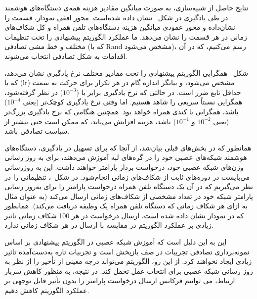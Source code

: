 نتایج حاصل از شبیه‌سازی، به صورت میانگین مقادیر هزینه همه‌ی دستگاه‌های هوشمند در طی یادگیری در شکل~ نشان‌ داده شده‌است. محور افقی نمودار، قسمت را نشان‌داده و محور عمودی میانگین هزینه دستگاه‌های تلفن همراه و کل شکاف‌های زمانی در هر قسمت را نشان می‌دهد. ما عملکرد الگوریتم پیشنهادی را تحت تنظیمات مختلف و خط مشی تصادفی (که با Rand مشخص می‌شود)، رسم می‌کنیم، که در آن اقدامات به شکل تصادفی انتخاب می‌شوند.



شکل~ همگرایی الگوریتم پیشنهادی را تحت مقادیر مختلف نرخ یادگیری نشان می‌دهد، که با (lr) مشخص می‌شود، و بیانگر اندازه گام در هر تکرار برای حرکت به سمت حداقل تابع ضرر است. در حالتی که نرخ یادگیری برابر با ($10^{-3}$) در نظر گرفته‌شود، همگرایی نسبتاً سریعی را شاهد هستیم. اما وقتی نرخ یادگیری کوچک‌تر (یعنی $10^{-4}$) باشد، همگرایی با کندی همراه خواهد بود. همچنین هنگامی که نرخ یادگیری بزرگ‌تر (یعنی $ 10^{-‌2}$ و $10^{-1}$) باشد، هزینه افزایش می‌یابد، که ممکن است حتی بیشتر از سیاست تصادفی باشد.
 



همانطور که در بخش‌های قبلی بیان‌شد، از آنجا که برای تسهیل در یادگیری، دستگاه‌های هوشمند شبکه‌های عصبی خود را در گره‌های لبه آموزش می‌دهند، برای به روز رسانی وزن‌های شبکه عصبی خود، درخواست بردار پارامتر خواهند داشت. این به روزرسانی می‌بایست در دوره‌های ثابت از شکاف‌های زمانی انجام‌شود. در شکل~، تنظیماتی را در نظر می‌گیریم که در آن یک دستگاه تلفن همراه درخواست پارامتر را برای به‌روز رسانی پارامتر شبکه خود در تعداد مشخصی از شکاف‌های زمانی ارسال می‌کند (به عنوان مثال به ازای هر شکاف زمانی که دستگاه تلفن همراه یک وظیفه دریافت می‌کند). همانطور که در نمودار نشان داده شده است، ارسال درخواست در هر 100 شکاف زمانی تاثیر زیادی بر عملکرد الگوریتم در مقایسه با ارسال در هر شکاف زمانی ندارد. 



این به این دلیل است که آموزش شبکه عصبی در الگوریتم پیشنهادی بر اساس نمونه‌برداری تصادفی تجربیات در صف بازپخش است و تجربیات تازه به‌دست‌آمده تاثیر زیادی ایجاد نخواهند کرد. از این رو، الگوریتم می‌تواند درجه معینی از تأخیر را از نظر به روز رسانی شبکه عصبی برای انتخاب عمل تحمل کند. در نتیجه، به منظور کاهش سربار ارتباط، می توانیم فرکانس ارسال درخواست پارامتر را بدون تأثیر قابل توجهی بر عملکرد الگوریتم کاهش دهیم.







